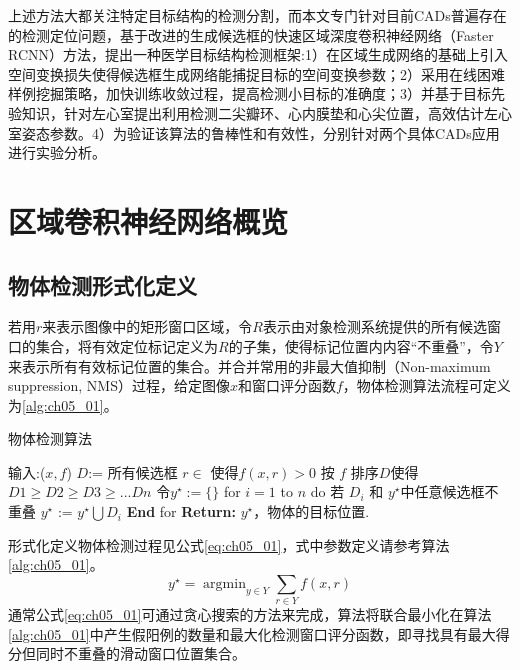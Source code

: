 上述方法大都关注特定目标结构的检测分割，而本文专门针对目前CADs普遍存在的检测定位问题，基于改进的生成候选框的快速区域深度卷积神经网络（Faster RCNN）\citep{Ren2015a}方法，提出一种医学目标结构检测框架:1）在区域生成网络的基础上引入空间变换损失使得候选框生成网络能捕捉目标的空间变换参数；2）采用在线困难样例挖掘策略，加快训练收敛过程，提高检测小目标的准确度；3）并基于目标先验知识，针对左心室提出利用检测二尖瓣环、心内膜垫和心尖位置，高效估计左心室姿态参数。4）为验证该算法的鲁棒性和有效性，分别针对两个具体CADs应用进行实验分析。

\section{区域卷积神经网络概览}
 
\subsection{物体检测形式化定义}
若用$r$来表示图像中的矩形窗口区域，令$R$表示由对象检测系统提供的所有候选窗口的集合，将有效定位标记定义为$R$的子集，使得标记位置内内容“不重叠”，令$Y$来表示所有有效标记位置的集合。并合并常用的非最大值抑制（Non-maximum suppression, NMS）过程，给定图像$x$和窗口评分函数$f$，物体检测算法流程可定义为\ref{alg:ch05_01}。
\begin{algorithm}[!htbp]
      \small
      \caption{物体检测算法}\label{alg:ch05_01}
      \begin{algorithmic}[1]
          \State 输入:{($x,f$)}
          \State $D$:= 所有候选框 $r \in$ 使得$f(x, r) > 0$            
          \State 按 $f$ 排序$D$使得 $D1\geq D2 \geq D3 \geq ...Dn$ 
          \State 令$y^\star:=\{ \}$
          \State \qquad for $i = 1$ to $n$ do
          \State  \qquad\qquad  若 $D_{i}$ 和 $y^\star$中任意候选框不重叠
          \State   \qquad \qquad      $y^\star$ := $y^\star  \bigcup {D_{i}}$
          \State \qquad\textbf{End} for 
          \State \textbf{Return:}  $y^\star$，物体的目标位置.
          \EndProcedure
      \end{algorithmic}
  \end{algorithm} 
 
形式化定义物体检测过程见公式\ref{eq:ch05_01}，式中参数定义请参考算法\ref{alg:ch05_01}。
\begin{equation} 
\label{eq:ch05_01}
      y^{\star}=\mathop{\arg\min}_{y\in Y}\sum _{r\in Y} f(x,r)
\end{equation}                               	 
通常公式\ref{eq:ch05_01}可通过贪心搜索的方法来完成，算法将联合最小化在算法\ref{alg:ch05_01}中产生假阳例的数量和最大化检测窗口评分函数，即寻找具有最大得分但同时不重叠的滑动窗口位置集合。
